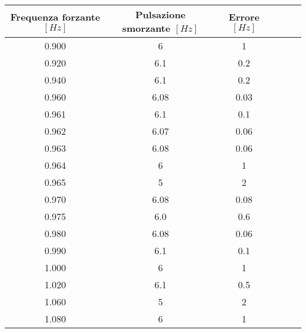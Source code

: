 \begin{tabular}{cccccc}
\toprule
Frequenza forzante $[Hz]$  & Pulsazione smorzante $[Hz]$ & Errore $[Hz]$\\ \midrule
0.900 & 6 & 1\\ \midrule
0.920 & 6.1 & 0.2\\ \midrule
0.940 & 6.1 & 0.2\\ \midrule
0.960 & 6.08 & 0.03\\ \midrule
0.961 & 6.1 & 0.1\\ \midrule
0.962 & 6.07 & 0.06\\ \midrule
0.963 & 6.08 & 0.06\\ \midrule
0.964 & 6 & 1\\ \midrule
0.965 & 5 & 2\\ \midrule
0.970 & 6.08 & 0.08\\ \midrule
0.975 & 6.0 & 0.6\\ \midrule
0.980 & 6.08 & 0.06\\ \midrule
0.990 & 6.1 & 0.1\\ \midrule
1.000 & 6 & 1\\ \midrule
1.020 & 6.1 & 0.5\\ \midrule
1.060 & 5 & 2\\ \midrule
1.080 & 6 & 1\\ \bottomrule
\end{tabular}
